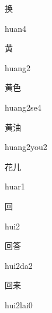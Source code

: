 \begin{multicols*}{2}
\begin{verbete}[huan4]{换}
\begin{pronuncia}{huan4}
\end{pronuncia}
\end{verbete}

\begin{verbete}[huang2]{黄}
\begin{pronuncia}{huang2}
\end{pronuncia}
\end{verbete}

\begin{verbete}[huang2se4]{黄色}
\begin{pronuncia}{huang2se4}
\end{pronuncia}
\end{verbete}

\begin{verbete}{黄油}
\begin{pronuncia}{huang2you2}
\end{pronuncia}
\end{verbete}

\begin{verbete}[huar1]{花儿}
\begin{pronuncia}{huar1}
\end{pronuncia}
\end{verbete}

\begin{verbete}[hui2]{回}
\begin{pronuncia}{hui2}
\end{pronuncia}
\end{verbete}

\begin{verbete}[hui2da2]{回答}
\begin{pronuncia}{hui2da2}
\end{pronuncia}
\end{verbete}

\begin{verbete}{回来}
\begin{pronuncia}{hui2lai0}
\end{pronuncia}
\end{verbete}


\end{multicols*}
